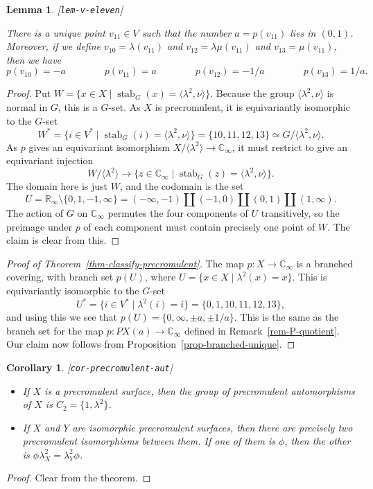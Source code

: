 \documentclass[reqno]{amsart}
\newcommand{\lbl}[1]{\label{#1}\textup{[\texttt{#1}]}\par}
\newcommand{\lbl}{\label}
\newcommand{\stab}	{\operatorname{stab}}
\newcommand{\lm}        {\lambda}
\newcommand{\R}         {{\mathbb{R}}}
\newcommand{\C}         {{\mathbb{C}}}
\newcommand{\ip}[1]     {\langle #1\rangle}
\newcommand{\st}        {\;|\;}
\newcommand{\sm}        {\setminus}
\renewcommand{\:}{\colon}
\newtheorem{lemma}[theorem]{Lemma}
\newtheorem{corollary}[theorem]{Corollary}
\theoremstyle{definition}
\begin{document}
\begin{lemma}\lbl{lem-v-eleven}
 There is a unique point $v_{11}\in V$ such that the number
 $a=p(v_{11})$ lies in $(0,1)$.  Moreover, if we define
 $v_{10}=\lm(v_{11})$ and $v_{12}=\lm\mu(v_{11})$ and
 $v_{13}=\mu(v_{11})$, then we have
 \[ p(v_{10}) = -a   \hspace{4em}
    p(v_{11}) =  a   \hspace{4em}
    p(v_{12}) = -1/a \hspace{4em}
    p(v_{13}) = 1/a.
 \]
\end{lemma}
\begin{proof}
 Put $W=\{x\in X\st\stab_G(x)=\ip{\lm^2,\nu}\}$.  Because the group
 $\ip{\lm^2,\nu}$ is normal in $G$, this is a $G$-set.  As $X$ is
 precromulent, it is equivariantly isomorphic to the $G$-set
 \[ W^* = \{i\in V^*\st \stab_G(i)=\ip{\lm^2,\nu}\} =
     \{10,11,12,13\} \simeq G/\ip{\lm^2,\nu}.
 \]
 As $p$ gives an equivariant isomorphism $X/\ip{\lm^2}\to\C_\infty$,
 it must restrict to give an equivariant injection
 \[ W/\ip{\lm^2} \to
     \{z\in\C_\infty\st\stab_G(z)=\ip{\lm^2,\nu}\}.
 \]
 The domain here is just $W$, and the codomain is the set
 \[ U = \R_\infty\sm\{0,1,-1,\infty\} =
     (-\infty,-1) \amalg
     (-1, 0)      \amalg
     ( 0, 1)      \amalg
     (1,\infty).
 \]
 The action of $G$ on $\C_\infty$ permutes the four components of $U$
 transitively, so the preimage under $p$ of each component must
 contain precisely one point of $W$.  The claim is clear from this.
\end{proof}

\begin{proof}[Proof of Theorem~\ref{thm-classify-precromulent}]
 The map $p\:X\to\C_\infty$ is a branched covering, with branch set
 $p(U)$, where $U=\{x\in X\st\lm^2(x)=x\}$.  This is equivariantly
 isomorphic to the $G$-set
 \[ U^*=\{i\in V^*\st\lm^2(i)=i\}=\{0,1,10,11,12,13\}, \]
 and using this we see that $p(U)=\{0,\infty,\pm a,\pm 1/a\}$.  This
 is the same as the branch set for the map $p\:PX(a)\to\C_\infty$
 defined in Remark~\ref{rem-P-quotient}.  Our claim now follows from
 Proposition~\ref{prop-branched-unique}.
\end{proof}

\begin{corollary}\lbl{cor-precromulent-aut}\leavevmode
 \begin{itemize}
  \item[(a)] If $X$ is a precromulent surface, then the group of
   precromulent automorphisms of $X$ is $C_2=\{1,\lm^2\}$.
  \item[(b)] If $X$ and $Y$ are isomorphic precromulent surfaces, then
   there are precisely two precromulent isomorphisms between them.  If
   one of them is $\phi$, then the other is $\phi\lm_X^2=\lm_Y^2\phi$.
 \end{itemize}
\end{corollary}
\begin{proof}
 Clear from the theorem.
\end{proof}
\end{document}
